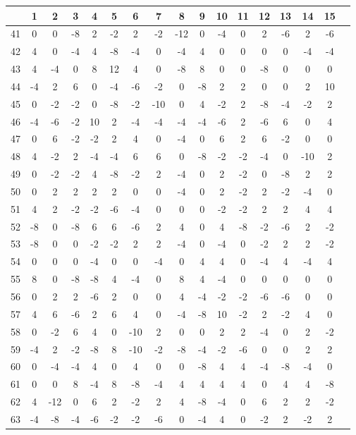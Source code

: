     \begin{tabular}{c||c|c|c|c|c|c|c|c|c|c|c|c|c|c|c|c}
        & 1 & 2 & 3 & 4 & 5 & 6 & 7 & 8 & 9 & 10 & 11 & 12 & 13 & 14 & 15 \\
        \hline
        \hline
41 & 0 & 0 & -8 & 2 & -2 & 2 & -2 & -12 & 0 & -4 & 0 & 2 & -6 & 2 & -6 \\
\hline
42 & 4 & 0 & -4 & 4 & -8 & -4 & 0 & -4 & 4 & 0 & 0 & 0 & 0 & -4 & -4 \\
\hline
43 & 4 & -4 & 0 & 8 & 12 & 4 & 0 & -8 & 8 & 0 & 0 & -8 & 0 & 0 & 0 \\
\hline
44 & -4 & 2 & 6 & 0 & -4 & -6 & -2 & 0 & -8 & 2 & 2 & 0 & 0 & 2 & 10 \\
\hline
45 & 0 & -2 & -2 & 0 & -8 & -2 & -10 & 0 & 4 & -2 & 2 & -8 & -4 & -2 & 2 \\
\hline
46 & -4 & -6 & -2 & 10 & 2 & -4 & -4 & -4 & -4 & -6 & 2 & -6 & 6 & 0 & 4 \\
\hline
47 & 0 & 6 & -2 & -2 & 2 & 4 & 0 & -4 & 0 & 6 & 2 & 6 & -2 & 0 & 0 \\
\hline
        48 & 4 & -2 & 2 & -4 & -4 & 6 & 6 & 0 & -8 & -2 & -2 & -4 & 0 & -10 & 2 \\
        \hline
49 & 0 & -2 & -2 & 4 & -8 & -2 & 2 & -4 & 0 & 2 & -2 & 0 & -8 & 2 & 2 \\
\hline
50 & 0 & 2 & 2 & 2 & 2 & 0 & 0 & -4 & 0 & 2 & -2 & 2 & -2 & -4 & 0 \\
\hline
51 & 4 & 2 & -2 & -2 & -6 & -4 & 0 & 0 & 0 & -2 & -2 & 2 & 2 & 4 & 4 \\
\hline
52 & -8 & 0 & -8 & 6 & 6 & -6 & 2 & 4 & 0 & 4 & -8 & -2 & -6 & 2 & -2 \\
\hline
53 & -8 & 0 & 0 & -2 & -2 & 2 & 2 & -4 & 0 & -4 & 0 & -2 & 2 & 2 & -2 \\
\hline
54 & 0 & 0 & 0 & -4 & 0 & 0 & -4 & 0 & 4 & 4 & 0 & -4 & 4 & -4 & 4 \\
\hline
55 & 8 & 0 & -8 & -8 & 4 & -4 & 0 & 8 & 4 & -4 & 0 & 0 & 0 & 0 & 0 \\
\hline
56 & 0 & 2 & 2 & -6 & 2 & 0 & 0 & 4 & -4 & -2 & -2 & -6 & -6 & 0 & 0 \\
\hline
57 & 4 & 6 & -6 & 2 & 6 & 4 & 0 & -4 & -8 & 10 & -2 & 2 & -2 & 4 & 0 \\
\hline
58 & 0 & -2 & 6 & 4 & 0 & -10 & 2 & 0 & 0 & 2 & 2 & -4 & 0 & 2 & -2 \\
\hline
59 & -4 & 2 & -2 & -8 & 8 & -10 & -2 & -8 & -4 & -2 & -6 & 0 & 0 & 2 & 2 \\
\hline
60 & 0 & -4 & -4 & 4 & 0 & 4 & 0 & 0 & -8 & 4 & 4 & -4 & -8 & -4 & 0 \\
\hline
61 & 0 & 0 & 8 & -4 & 8 & -8 & -4 & 4 & 4 & 4 & 4 & 0 & 4 & 4 & -8 \\
\hline
62 & 4 & -12 & 0 & 6 & 2 & -2 & 2 & 4 & -8 & -4 & 0 & 6 & 2 & 2 & -2 \\
\hline
63 & -4 & -8 & -4 & -6 & -2 & -2 & -6 & 0 & -4 & 4 & 0 & -2 & 2 & -2 & 2
\end{tabular}

